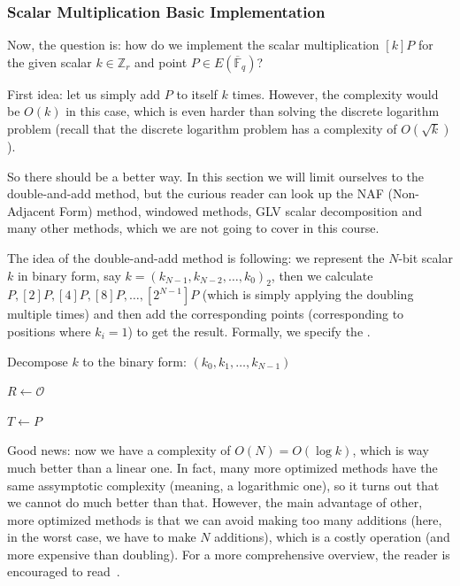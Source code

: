 \documentclass[../../book.tex]{subfiles}
\begin{document}
\subsubsection{Scalar Multiplication Basic Implementation}

Now, the question is: how do we implement the scalar multiplication $[k]P$ for the given scalar $k \in \mathbb{Z}_r$ and point $P \in E(\overline{\mathbb{F}}_q)$? 

First idea: let us simply add $P$ to itself $k$ times. However, the complexity would be $O(k)$ in this case, which is even harder than solving the discrete logarithm problem (recall that the discrete logarithm problem has a complexity of $O(\sqrt{k})$).

So there should be a better way. In this section we will limit ourselves to the double-and-add method, but the curious reader can look up the NAF (Non-Adjacent Form) method, windowed methods, GLV scalar decomposition and many other methods, which we are not going to cover in this course.

The idea of the double-and-add method is following: we represent the $N$-bit scalar $k$ in binary form, say $k = (k_{N-1},k_{N-2},\dots,k_0)_2$, then we calculate $P, [2]P, [4]P, [8]P, \dots, [2^{N-1}]P$ (which is simply applying the doubling multiple times) and then add the corresponding points (corresponding to positions where $k_i=1$) to get the result. Formally, we specify the .

\begin{algorithm}[H]
    \caption{Double-and-add method for scalar multiplication}\label{alg:double_and_add}
    
    Decompose $k$ to the binary form: $(k_0,k_1,\dots,k_{N-1})$
    
    $R \gets \mathcal{O}$
    
    $T \gets P$
    
    
\end{algorithm}    

Good news: now we have a complexity of $O(N)=O(\log k)$, which is way much better than a linear one. In fact, many more optimized methods have the same assymptotic complexity (meaning, a logarithmic one), so it turns out that 
we cannot do much better than that. However, the main advantage of other, more optimized methods is that we can avoid making too many additions (here, in the worst case, we have to make $N$ additions), which is a costly operation (and more expensive than doubling).
For a more comprehensive overview, the reader is encouraged to read~\cite{guide-to-ec}.
\end{document}
